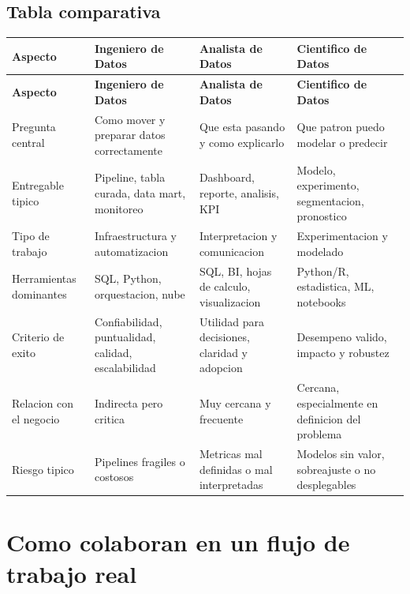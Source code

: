 \documentclass[12pt]{article}
\begin{document}
\subsection{Tabla comparativa}
\begin{longtable}{@{}p{}p{}p{}p{}@{}}
\toprule
\textbf{Aspecto} & \textbf{Ingeniero de Datos} & \textbf{Analista de Datos} & \textbf{Cientifico de Datos} \\
\midrule
\endfirsthead
\toprule
\textbf{Aspecto} & \textbf{Ingeniero de Datos} & \textbf{Analista de Datos} & \textbf{Cientifico de Datos} \\
\midrule
\endhead

Pregunta central &
Como mover y preparar datos correctamente &
Que esta pasando y como explicarlo &
Que patron puedo modelar o predecir \\

Entregable tipico &
Pipeline, tabla curada, data mart, monitoreo &
Dashboard, reporte, analisis, KPI &
Modelo, experimento, segmentacion, pronostico \\

Tipo de trabajo &
Infraestructura y automatizacion &
Interpretacion y comunicacion &
Experimentacion y modelado \\

Herramientas dominantes &
SQL, Python, orquestacion, nube &
SQL, BI, hojas de calculo, visualizacion &
Python/R, estadistica, ML, notebooks \\

Criterio de exito &
Confiabilidad, puntualidad, calidad, escalabilidad &
Utilidad para decisiones, claridad y adopcion &
Desempeno valido, impacto y robustez \\

Relacion con el negocio &
Indirecta pero critica &
Muy cercana y frecuente &
Cercana, especialmente en definicion del problema \\

Riesgo tipico &
Pipelines fragiles o costosos &
Metricas mal definidas o mal interpretadas &
Modelos sin valor, sobreajuste o no desplegables \\

\bottomrule
\end{longtable}

\section{Como colaboran en un flujo de trabajo real}
\end{document}
